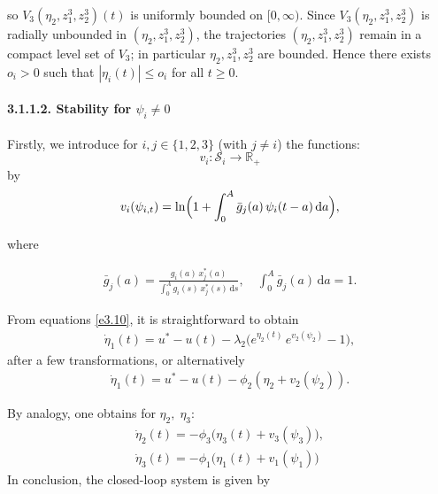 \documentclass[10pt, a4paper]{amsart}
\makeatletter
\theoremstyle{plain}
\theoremstyle{definition}
\theoremstyle{remark}
\renewenvironment{proof}[1][\proofname]{\par
  \pushQED{\qed}%
  \normalfont \topsep6\p@\@plus6\p@\relax
  \trivlist
  \item[\hskip\labelsep
        \itshape
    #1\ \ref{#1}.]\ignorespaces
}{%
  \popQED\endtrivlist\@endpefalse
}
\numberwithin{equation}{section}
\makeatother
\begin{document}
\begin{proof}[of Lemma \ref{lem3.11}]
\begin{itemize}
so $V_3(\eta_2, z^3_1, z^3_2)(t)$ is uniformly bounded on $[0,\infty)$.
Since $V_3(\eta_2, z^3_1, z^3_2)$ is radially unbounded in $(\eta_2,z^3_1,z^3_2)$, the trajectories $(\eta_2,z^3_1,z^3_2)$ remain in a compact level set of $V_3$; in particular $\eta_2,z^3_1,z^3_2$ are bounded.
Hence there exists $o_i>0$ such that $|\eta_i(t)|\le o_i$ for all $t\ge0$. 
\end{itemize}
\end{proof}
\paragraph{\bf 3.1.1.2. Stability for $\psi_i\neq 0$}
Firstly, we introduce for $i,j\in\{1,2,3\}$ (with $j\neq i$) the functions: 
$$v_i : \mathcal{S}_i\longrightarrow\mathbb{R}_+$$
by 
\begin{align}
    v_i(\psi_{i,t})
= \ln\Bigl(1 + \int_0^A \bar g_j(a)\,\psi_i(t-a)\,\mathrm{d}a\Bigr),
\end{align}

where

\begin{align}
    \bar g_j(a)
= \frac{g_i(a)\,x^*_j(a)}{\displaystyle\int_0^A g_i(s)\,x^*_j(s)\,\mathrm{d}s},
\quad
\int_0^A \bar g_j(a)\,\mathrm{d}a = 1.
\end{align}

From equations \eqref{e3.10}, it is straightforward to obtain
\begin{align*}
\dot\eta_1(t)
= u^* - u(t)-\lambda_2\bigl(e^{\eta_2(t)}\,e^{v_2(\psi_{2})}-1\bigr),
\end{align*}
after a few transformations, or alternatively
\begin{align*}
\dot{\eta}_1(t)= u^* - u(t) - \phi_2(\eta_2+v_2(\psi_2)).
\end{align*}

By analogy, one obtains for $\eta_2,\;\eta_3$:
\begin{align*}
\dot{\eta}_2(t)
= -\phi_3\bigl(\eta_3(t) + v_3(\psi_{3})\bigr),\\
\dot{\eta}_3(t)
= -\phi_1\bigl(\eta_1(t) + v_1(\psi_{1})\bigr)
\end{align*}
In conclusion,  the closed-loop system is given by
\end{document}
